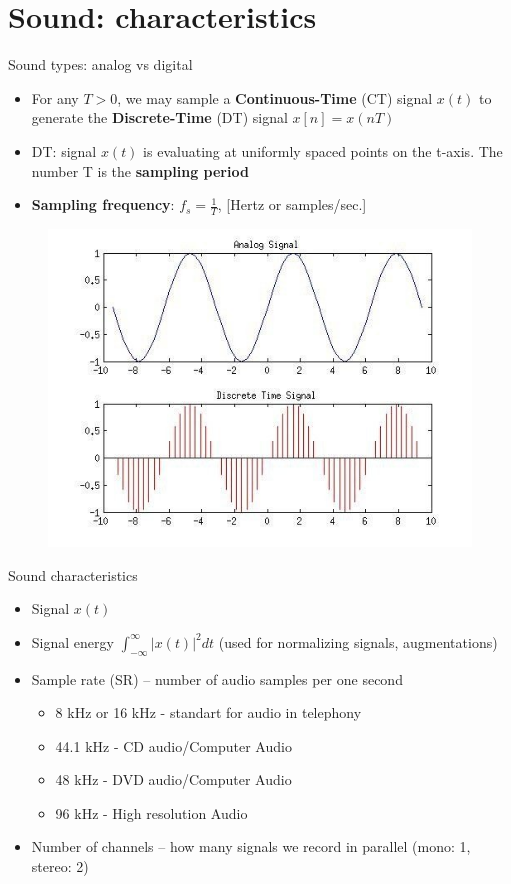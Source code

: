 \section{Sound: characteristics}
\begin{frame}{Sound types: analog vs digital}
		\begin{itemize}
			\item For any $T > 0$, we may sample a \textbf{Continuous-Time} (CT) signal $x(t)$ to generate the \textbf{Discrete-Time} (DT) signal $x[n]=x(nT)$
			\item DT: signal $x(t)$ is evaluating at uniformly spaced points on the t-axis. The number T is the \textbf{sampling period}
			\item \textbf{Sampling frequency}: $f_s=\frac{1}{T}$, {[Hertz or samples/sec.]}
		\end{itemize}
	\begin{figure}
		\centering
		\includegraphics[width=0.6\linewidth]{figs/analog_discrete.png}
	\end{figure}
\end{frame}
\begin{frame}{Sound characteristics}
	\begin{itemize}
		\item Signal $x(t)$
		\item Signal energy $\int_{-\infty}^{\infty}|x(t)|^2 d t$ (used for normalizing signals, augmentations)
		\item Sample rate (SR) -- number of audio samples per one second
			\begin{itemize}
				\item 8 kHz or 16 kHz - standart for audio in telephony
				\item 44.1 kHz - CD audio/Computer Audio
				\item 48 kHz - DVD audio/Computer Audio
				\item 96 kHz - High resolution Audio
			\end{itemize}
		\item Number of channels -- how many signals we record in parallel (mono: 1, stereo: 2)
	\end{itemize}
\end{frame}
